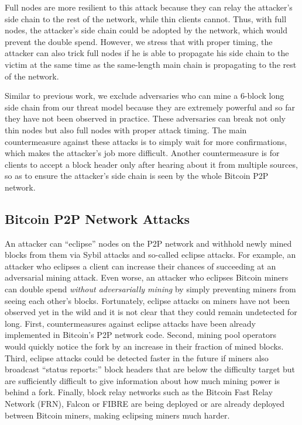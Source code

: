 Full nodes are more resilient to this attack because they can relay the attacker's side chain to the rest of the network, while thin clients cannot.
Thus, with full nodes, the attacker's side chain could be adopted by the network, which would prevent the double spend.
However, we stress that with proper timing, the attacker can also trick full nodes if he is able to propagate his side chain to the victim at the same time as the same-length main chain is propagating to the rest of the network\cite{bitcoin-security-revisited}.

Similar to previous work\cite{virtualchain, blockstack, keybase, bitcoin-smc, bitcoin-anon-cred, versum, bitcoin-incent-comp, bitcoin-pred-mkt,commitcoin}, we exclude adversaries who can mine a 6-block long side chain from our threat model because they are extremely powerful and so far they have not been observed in practice.
These adversaries can break not only thin nodes but also full nodes with proper attack timing.
The main countermeasure against these attacks is to simply wait for more confirmations, which makes the attacker's job more difficult.
Another countermeasure is for \Sys clients to accept a block header only after hearing about it from multiple sources, so as to ensure the attacker's side chain is seen by the whole Bitcoin P2P network.


\subsection{Bitcoin P2P Network Attacks}
An attacker can ``eclipse'' nodes on the P2P network and withhold newly mined blocks from them via Sybil attacks\cite{sybil} and so-called eclipse attacks\cite{eclipse}.
For example, an attacker who eclipses a \Sys client can increase their chances of succeeding at an adversarial mining attack.
Even worse, an attacker who eclipses Bitcoin miners can double spend \emph{without adversarially mining} by simply preventing miners from seeing each other's blocks.
Fortunately, eclipse attacks on miners have not been observed yet in the wild and it is not clear that they could remain undetected for long.
First, countermeasures against eclipse attacks have been already implemented in Bitcoin's P2P network code.
Second, mining pool operators would quickly notice the fork by an increase in their fraction of mined blocks.
Third, eclipse attacks could be detected faster in the future if miners also broadcast ``status reports:'' block headers that are below the difficulty target but are sufficiently difficult to give information about how much mining power is behind a fork\cite{canary}.
Finally, block relay networks such as the Bitcoin Fast Relay Network (FRN)\cite{bitcoin-relay-network}, Falcon\cite{falcon} or FIBRE\cite{fibre} are being deployed or are already deployed between Bitcoin miners, making eclipsing miners much harder.

